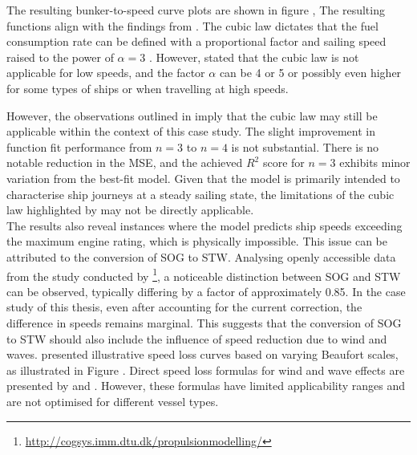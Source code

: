 The resulting bunker-to-speed curve plots are shown in figure , The resulting functions align with the findings from . The cubic law dictates that the fuel consumption rate can be defined with a proportional factor and sailing speed raised to the power of $\alpha = 3$ . However,  stated that the cubic law is not applicable for low speeds, and the factor $\alpha$ can be 4 or 5 or possibly even higher for some types of ships or when travelling at high speeds.\\ 

\pagebreak

However, the observations outlined in  imply that the cubic law may still be applicable within the context of this case study. The slight improvement in function fit performance from $n = 3$ to $n = 4$ is not substantial. There is no notable reduction in the MSE, and the achieved $R^2$ score for $n = 3$ exhibits minor variation from the best-fit model. Given that the model is primarily intended to characterise ship journeys at a steady sailing state, the limitations of the cubic law highlighted by \citet{Psaraftis.2013} may not be directly applicable.\\


The results also reveal instances where the model predicts ship speeds exceeding the maximum engine rating, which is physically impossible. This issue can be attributed to the conversion of SOG to STW. Analysing openly accessible data from the study conducted by \footnote{\url{http://cogsys.imm.dtu.dk/propulsionmodelling/}}, a noticeable distinction between SOG and STW can be observed, typically differing by a factor of approximately 0.85. In the case study of this thesis, even after accounting for the current correction, the difference in speeds remains marginal. This suggests that the conversion of SOG to STW should also include the influence of speed reduction due to wind and waves.  presented illustrative speed loss curves based on varying Beaufort scales, as illustrated in Figure . Direct speed loss formulas for wind and wave effects are presented by  and . However, these formulas have limited applicability ranges and are not optimised for different vessel types.\\

